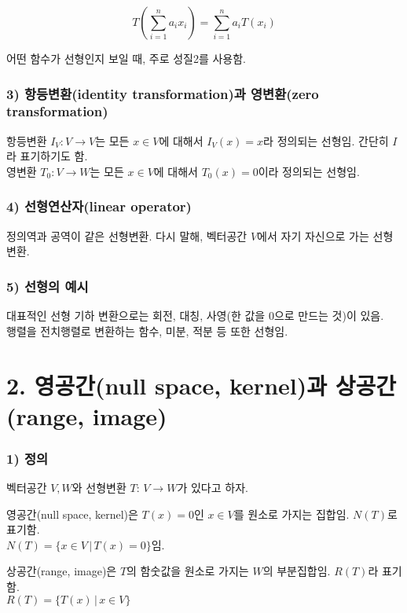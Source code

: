 \[
T(\sum_{i=1}^{n}{a_i x_i})=\sum_{i=1}^{n}{a_i T(x_i)}
\]

어떤 함수가 선형인지 보일 때, 주로 성질2를 사용함.

\subsubsection*{3) 항등변환(identity transformation)과 영변환(zero transformation)}
항등변환 $I_V : V \rightarrow V$는 모든 $x \in V$에 대해서 $I_V(x)=x$라 정의되는 선형임. 간단히 $I$라 표기하기도 함.\\
영변환 $T_0 : V \rightarrow W$는 모든 $x \in V$에 대해서 $T_0(x)=0$이라 정의되는 선형임.

\subsubsection*{4) 선형연산자(linear operator)}
정의역과 공역이 같은 선형변환. 다시 말해, 벡터공간 $V$에서 자기 자신으로 가는 선형변환.

\subsubsection*{5) 선형의 예시}
대표적인 선형 기하 변환으로는 회전, 대칭, 사영(한 값을 0으로 만드는 것)이 있음.\\
행렬을 전치행렬로 변환하는 함수, 미분, 적분 등 또한 선형임.\\


\newpage


\section*{2. 영공간(null space, kernel)과 상공간(range, image)}

\subsubsection*{1) 정의\\}
\begin{DEF}
벡터공간 $V, W$와 선형변환 $T:\,V \rightarrow W$가 있다고 하자.

영공간(null space, kernel)은 $T(x)=0$인 $x \in V$를 원소로 가지는 집합임. $N(T)$로 표기함.\\$N(T)=\{x \in V\,|\,T(x)=0\}$임.

상공간(range, image)은 $T$의 함숫값을 원소로 가지는 $W$의 부분집합임. $R(T)$라 표기함.\\$R(T)=\{T(x)\,|\,x \in V\}$
\end{DEF}


